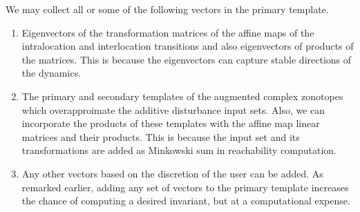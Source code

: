   We may collect all or some of
the following vectors in the primary template.
%
\begin{enumerate}
\item Eigenvectors of the transformation matrices of the affine maps
  of the intralocation and interlocation transitions and also
  eigenvectors of products of the matrices.  This is because the
  eigenvectors can capture stable directions of the dynamics.
\item The primary and secondary templates of the augmented complex
  zonotopes which overapproimate the additive disturbance input sets.
  Also, we can incorporate the products of these templates with the
  affine map linear matrices and their products.  This is because the
  input set and its transformations are added as Minkowski sum in
  reachability computation.
\item Any other vectors based on the discretion of the user can be
  added.  As remarked earlier, adding any set of vectors to the
  primary template increases the chance of computing a desired
  invariant, but at a computational expense.
\end{enumerate}
